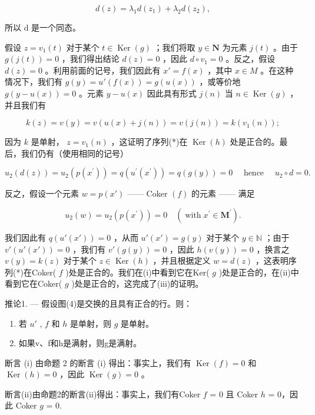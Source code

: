 \[
d (z) = \lambda_ {1} d (z _ {1}) + \lambda_ {2} d (z _ {2}),
\]

所以 d 是一个同态。

假设 \(z = v_1(t)\) 对于某个 \(t \in \operatorname{Ker}(g)\) ；我们将取 \(y \in \mathbf{N}\) 为元素 \(j(t)\) 。由于 \(g(j(t)) = 0\) ，我们得出结论 \(d(z) = 0\) ，因此 \(d \circ v_1 = 0\) 。反之，假设 \(d(z) = 0\) 。利用前面的记号，我们因此有 \(x' = f(x)\) ，其中 \(x \in M\) 。在这种情况下，我们有 \(g(y) = u'(f(x)) = g(u(x))\) ，或等价地 \(g(y - u(x)) = 0\) 。元素 \(y - u(x)\) 因此具有形式 \(j(n)\) 当 \(n \in \operatorname{Ker}(g)\) ，并且我们有

\[
k (z) = v (y) = v (u (x) + j (n)) = v (j (n)) = k \left(v _ {1} (n)\right);
\]

因为 \(k\) 是单射， \(z = v_{1}(n)\) ，这证明了序列(*)在 \(\operatorname{Ker}(h)\) 处是正合的。最后，我们仍有（使用相同的记号）

\[
u _ {2} (d (z)) = u _ {2} \left(p \left(x ^ {\prime}\right)\right) = q \left(u ^ {\prime} \left(x ^ {\prime}\right)\right) = q (g (y)) = 0 \quad \text {   hence   } \quad u _ {2} \circ d = 0.
\]

反之，假设一个元素 \(w = p(x')\) —— Coker \((f)\) 的元素 —— 满足

\[
u _ {2} (w) = u _ {2} \left(p \left(x ^ {\prime}\right)\right) = 0 \quad \left(\operatorname{with} x ^ {\prime} \in \mathbf {M} ^ {\prime}\right).
\]

我们因此有 \(q(u'(x')) = 0\) ，从而 \(u'(x') = g(y)\) 对于某个 \(y \in \mathbb{N}\) ；由于 \(v'(u'(x')) = 0\) ，我们有 \(v'(g(y)) = 0\) ，因此 \(h(v(y)) = 0\) ，换言之 \(v(y) = k(z)\) 对于某个 \(z \in \operatorname{Ker}(h)\) ，并且根据定义 \(w = d(z)\) ，这表明序列(*)在Coker( \(f\) )处是正合的。我们在(i)中看到它在Ker( \(g\) )处是正合的，在(ii)中看到它在Coker( \(g\) )处是正合的，这完成了(iii)的证明。

推论1. --- 假设图(4)是交换的且具有正合的行。则：

\begin{enumerate}
\def\labelenumi{(\roman{enumi})}
\item
  若 \(u'\) , \(f\) 和 \(h\) 是单射，则 \(g\) 是单射。
\item
  如果v、f和h是满射，则g是满射。
\end{enumerate}

断言 (i) 由命题 2 的断言 (i) 得出：事实上，我们有 \(\operatorname{Ker}(f) = 0\) 和 \(\operatorname{Ker}(h) = 0\) ，因此 \(\operatorname{Ker}(g) = 0\) 。

断言(ii)由命题2的断言(ii)得出：事实上，我们有Coker \(f\) = 0 且 Coker \(h\) = 0，因此 Coker \(g\) = 0.

